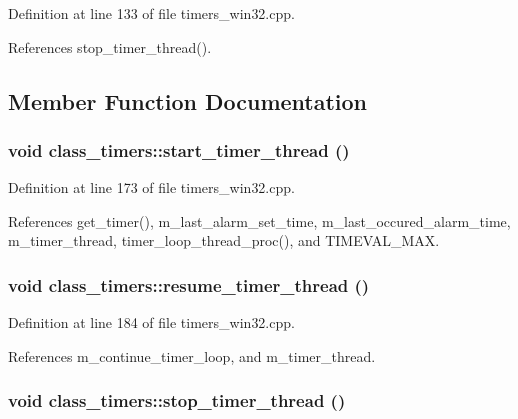 Definition at line 133 of file timers\_\-win32.cpp.

References stop\_\-timer\_\-thread().

\subsection{Member Function Documentation}
\hypertarget{classclass__timers_d857a63670354f41759f68d4ea29a0f5}{
\subsubsection[start\_\-timer\_\-thread]{\setlength{\rightskip}{0pt plus 5cm}void class\_\-timers::start\_\-timer\_\-thread ()}}
\label{classclass__timers_d857a63670354f41759f68d4ea29a0f5}




Definition at line 173 of file timers\_\-win32.cpp.

References get\_\-timer(), m\_\-last\_\-alarm\_\-set\_\-time, m\_\-last\_\-occured\_\-alarm\_\-time, m\_\-timer\_\-thread, timer\_\-loop\_\-thread\_\-proc(), and TIMEVAL\_\-MAX.\hypertarget{classclass__timers_e0066fac671c6adb997d6c075487af89}{
\subsubsection[resume\_\-timer\_\-thread]{\setlength{\rightskip}{0pt plus 5cm}void class\_\-timers::resume\_\-timer\_\-thread ()}}
\label{classclass__timers_e0066fac671c6adb997d6c075487af89}




Definition at line 184 of file timers\_\-win32.cpp.

References m\_\-continue\_\-timer\_\-loop, and m\_\-timer\_\-thread.\hypertarget{classclass__timers_a78d9f5ab159ec6b11b4dc4c8f351697}{
\subsubsection[stop\_\-timer\_\-thread]{\setlength{\rightskip}{0pt plus 5cm}void class\_\-timers::stop\_\-timer\_\-thread ()}}
\label{classclass__timers_a78d9f5ab159ec6b11b4dc4c8f351697}




